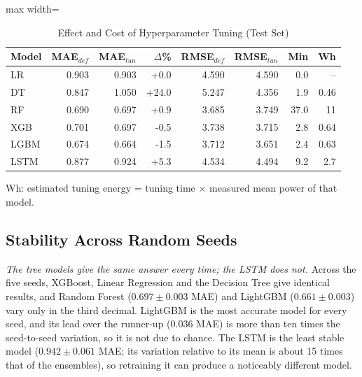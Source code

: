 \documentclass[conference,letterpaper,10pt]{IEEEtran}
\begin{document}
\begin{table}[!htb]
\centering
\caption{Effect and Cost of Hyperparameter Tuning (Test Set)}
\label{tab:tuning}
\footnotesize
\setlength{\tabcolsep}{4pt}
\begin{adjustbox}{max width=\columnwidth}
\begin{tabular}{lrrrrrrr}
\toprule
Model & MAE$_{def}$ & MAE$_{tun}$ & $\Delta$\% & RMSE$_{def}$ & RMSE$_{tun}$ & Min & Wh \\
\midrule
LR & 0.903 & 0.903 & +0.0 & 4.590 & 4.590 & 0.0 & -- \\
DT & 0.847 & 1.050 & +24.0 & 5.247 & 4.356 & 1.9 & 0.46 \\
RF & 0.690 & 0.697 & +0.9 & 3.685 & 3.749 & 37.0 & 11 \\
XGB & 0.701 & 0.697 & -0.5 & 3.738 & 3.715 & 2.8 & 0.64 \\
LGBM & 0.674 & 0.664 & -1.5 & 3.712 & 3.651 & 2.4 & 0.63 \\
LSTM & 0.877 & 0.924 & +5.3 & 4.534 & 4.494 & 9.2 & 2.7 \\
\bottomrule
\end{tabular}
\end{adjustbox}
\par\vspace{3pt}
{\scriptsize Wh: estimated tuning energy = tuning time $\times$ measured mean power of that model.\par}
\end{table}

\subsection{Stability Across Random Seeds}
\textit{The tree models give the same answer every time; the LSTM does not.} Across the five seeds, XGBoost, Linear Regression and the Decision Tree give identical results, and Random Forest ($0.697\pm0.003$ MAE) and LightGBM ($0.661\pm0.003$) vary only in the third decimal. LightGBM is the most accurate model for every seed, and its lead over the runner-up (0.036 MAE) is more than ten times the seed-to-seed variation, so it is not due to chance. The LSTM is the least stable model ($0.942\pm0.061$ MAE; its variation relative to its mean is about 15 times that of the ensembles), so retraining it can produce a noticeably different model.
\end{document}
